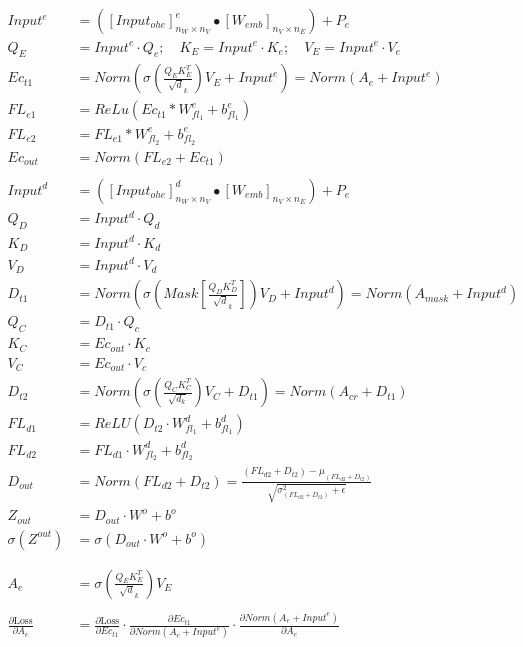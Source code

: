 \documentclass[12pt,letterpaper]{article}
\begin{document}
 
\begin{align*}
Input^{e}&=([Input_{ohe}]^{e}_{n_{W} \times n_V } \bullet [W_{emb}]_{n_V \times n_E})+P_e \\
Q_E&=Input^e \cdot Q_{e}; \quad K_E =Input^e \cdot K_{e}; \quad V_E=Input^e \cdot V_{e}\\
Ec_{t1}&=Norm(\sigma(\frac{Q_{E} K_{E}^T}{\sqrt d_k})V_{E}+Input^{e})=Norm(A_{e}+Input^{e})\\
FL_{e1}&=ReLu(Ec_{t1}*W^e_{fl_1}+b^e_{fl_1})\\
FL_{e2}&=FL_{e1}*W^e_{fl_2}+b^e_{fl_2}\\
Ec_{out}&=Norm(FL_{e2}+Ec_{t1})\\ \\
Input^{d}&=([Input_{ohe}]^{d}_{n_{W} \times n_V } \bullet [W_{emb}]_{n_V \times n_E})+P_e \\
Q_D&=Input^d \cdot Q_{d}\\
K_D&=Input^d \cdot K_{d}\\
V_D&=Input^d \cdot V_{d}\\
D_{t1}&=Norm(\sigma(Mask[\frac{Q_{D} K_{D}^T}{\sqrt d_k}])V_{D}+Input^{d})=Norm(A_{mask}+Input^d)\\
Q_C &= D_{t1} \cdot Q_{c}  \\
K_C &= Ec_{out} \cdot K_{c} \\
V_C &= Ec_{out} \cdot V_{c} \\
D_{t2} &= Norm\left(\sigma\left(\frac{Q_{C} K_{C}^T}{\sqrt{d_k}}\right) V_{C} + D_{t1}\right) = Norm(A_{cr}+D_{t1}) \\ %
FL_{d1} &= ReLU(D_{t2} \cdot W^d_{fl_1} + b^d_{fl_1}) \\
FL_{d2} &= FL_{d1} \cdot W^d_{fl_2} + b^d_{fl_2} \\
D_{out} &= Norm(FL_{d2} + D_{t2}) =\frac{(FL_{d2} + D_{t2})-\mu_{(FL_{d2} + D_{t2})}}{\sqrt{\sigma^2_{(FL_{d2} + D_{t2})}+\epsilon}}\\
Z_{out} &= D_{out} \cdot W^o + b^o \\
\sigma(Z^{out}) &= \sigma(D_{out} \cdot W^o + b^o) \\\\
\\
A_{e}&=\sigma(\frac{Q_{E} K_{E}^T}{\sqrt d_k})V_{E}
\\
\\
\frac{\partial \text{Loss}}{\partial A_{e}} &= %
\frac{\partial \text{Loss}}{\partial Ec_{t1}} \cdot 
\frac{\partial Ec_{t1}}{\partial Norm(A_{e}+Input^{e})} \cdot 
\frac{\partial Norm(A_{e}+Input^{e})}{\partial A_{e}} 
\\

\end{align*}
\end{document}
